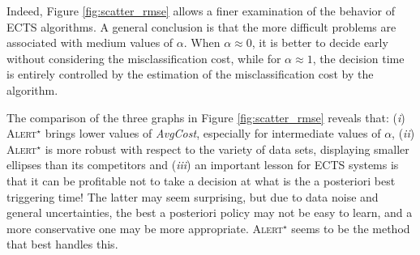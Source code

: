 \documentclass[sigconf, nonacm, table]{acmart}
\begin{document}
\begin{figure*}[!htb]
    \centering
    \label{fig:scatter_cal}
    \caption{The $x$-axis reports how far is the triggering time from the best a posteriori one: left is better. The $y$-axis reports the difference between the \textit{AvgCost} incurred by the algorithm compared to the best a posteriori one, \textit{AvgCost}$^{\star}$ : lower is better. The black crosses report the average performance for each value of $\alpha$ (greater values correspond to higher relative importance of the delay cost). Ellipses display $2 \times$ the standard deviation over both axis, computed for each $\alpha$ value.}
    \label{fig:scatter_rmse}
\end{figure*}

 Indeed, Figure \ref{fig:scatter_rmse} allows a finer examination of the behavior of ECTS algorithms. 
 A general conclusion is that the more difficult problems are associated with medium values of $\alpha$. When $\alpha \approx 0$, it is better to decide early without considering the misclassification cost, while for $\alpha \approx 1$, the decision time is entirely controlled by the estimation of the misclassification cost by the algorithm. 

 The comparison of the three graphs in Figure \ref{fig:scatter_rmse} reveals that: (\textit{i}) \textsc{Alert}$^\star$ brings lower values of \textit{AvgCost}, especially for intermediate values of $\alpha$, (\textit{ii})  \textsc{Alert}$^{\star}$ is more robust with respect to the variety of data sets, displaying smaller ellipses than its competitors and (\textit{iii}) an important lesson for ECTS systems is that it can be profitable not to take a decision at what is the a posteriori best triggering time! The latter may seem surprising, but due to data noise and general uncertainties, the best a posteriori policy may not be easy to learn, and a more conservative one may be more appropriate. \textsc{Alert}$^{\star}$ seems to be the method that best handles this.



    
\end{document}
